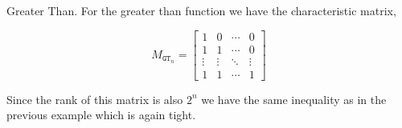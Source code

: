 \documentclass[usletter]{article}
\begin{document}
\begin{example} Greater Than.
  For the greater than function we have the characteristic matrix,

\begin{equation*}
  M_{\mathtt{GT}_n} =
  \begin{bmatrix}
  1 & 0 & \cdots & 0 \\
  1 & 1 & \cdots & 0 \\
  \vdots & \vdots & \ddots & \vdots \\
  1 & 1 & \cdots & 1
  \end{bmatrix}
\end{equation*}

Since the rank of this matrix is also $2^n$ we have the same inequality as in the previous example which is again tight.
\end{example}
\end{document}
